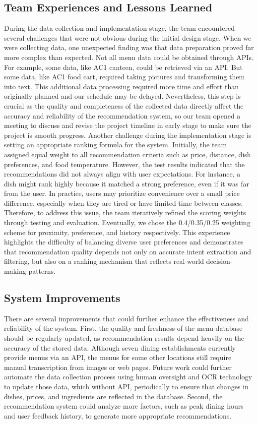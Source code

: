 \documentclass{article}
\begin{document}
\subsection{Team Experiences and Lessons Learned}
During the data collection and implementation stage, the team encountered several challenges that were not obvious during the initial design stage. When we were collecting data, one unexpected finding was that data preparation proved far more complex than expected. Not all menu data could be obtained through APIs. For example, some data, like AC1 canteen, could be retrieved via an API. But some data, like AC1 food cart, required taking pictures and transforming them into text. This additional data processing required more time and effort than originally planned and our schedule may be delayed. Nevertheless, this step is crucial as the quality and completeness of the collected data directly affect the accuracy and reliability of the recommendation system, so our team opened a meeting to discuss and revise the project timeline in early stage to make sure the project is smooth progress.
Another challenge during the implementation stage is setting an appropriate ranking formula for the system. Initially, the team assigned equal weight to all recommendation criteria such as price, distance, dish preferences, and food temperature. However, the test results indicated that the recommendations did not always align with user expectations. For instance, a dish might rank highly because it matched a strong preference, even if it was far from the user. In practice, users may prioritize convenience over a small price difference, especially when they are tired or have limited time between classes. Therefore, to address this issue, the team iteratively refined the scoring weights through testing and evaluation. Eventually, we chose the 0.4/0.35/0.25 weighting scheme for proximity, preference, and history respectively. This experience highlights the difficulty of balancing diverse user preferences and demonstrates that recommendation quality depends not only on accurate intent extraction and filtering, but also on a ranking mechanism that reflects real-world decision-making patterns.
\subsection{System Improvements}
There are several improvements that could further enhance the effectiveness and reliability of the system. First, the quality and freshness of the menu database should be regularly updated, as recommendation results depend heavily on the accuracy of the stored data. Although seven dining establishments currently provide menus via an API, the menus for some other locations still require manual transcription from images or web pages. Future work could further automate the data collection process using human oversight and OCR technology to update those data, which without API, periodically to ensure that changes in dishes, prices, and ingredients are reflected in the database. Second, the recommendation system could analyze more factors, such as peak dining hours and user feedback history, to generate more appropriate recommendations.
\end{document}

